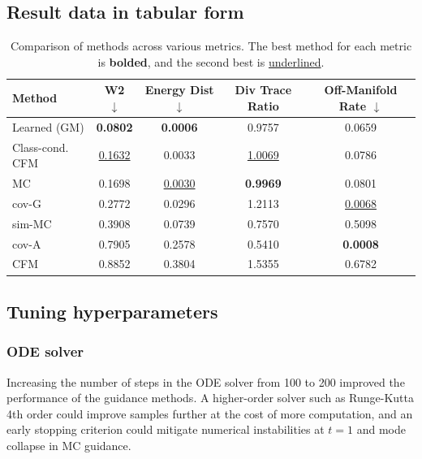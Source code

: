 \documentclass{article}
\begin{document}
\subsection{Result data in tabular form}

\begin{table}[H]
\centering
\caption{Comparison of methods across various metrics. The best method for each metric is \textbf{bolded}, and the second best is \underline{underlined}.}
\label{tab:method_comparison_no_index}
\begin{tabular}{lcccc}
\toprule
\textbf{Method} & \textbf{W2} $\downarrow$ & \textbf{Energy Dist} $\downarrow$ & \textbf{Div Trace Ratio} & \textbf{Off-Manifold Rate} $\downarrow$ \\
\midrule
Learned (GM)    & \textbf{0.0802} & \textbf{0.0006} & 0.9757 & 0.0659 \\
Class-cond. CFM & \underline{0.1632} & 0.0033 & \underline{1.0069} & 0.0786 \\
MC              & 0.1698 & \underline{0.0030} & \textbf{0.9969} & 0.0801 \\
cov-G           & 0.2772 & 0.0296 & 1.2113 & \underline{0.0068} \\
sim-MC          & 0.3908 & 0.0739 & 0.7570 & 0.5098 \\
cov-A           & 0.7905 & 0.2578 & 0.5410 & \textbf{0.0008} \\
CFM             & 0.8852 & 0.3804 & 1.5355 & 0.6782 \\
\bottomrule
\end{tabular}
\end{table}

\subsection{Tuning hyperparameters}
\label{app:Tuning hyperparameters}

\subsubsection{ODE solver}
Increasing the number of steps in the ODE solver from 100 to 200 improved the performance of the guidance methods.
A higher-order solver such as Runge-Kutta 4th order could improve samples further at the cost of more computation, and an early stopping criterion could mitigate numerical instabilities at $t=1$ and mode collapse in MC guidance.
\end{document}
